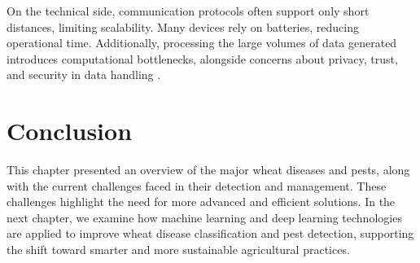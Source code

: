 On the technical side, communication protocols often support only short distances, limiting scalability. Many devices rely on batteries, reducing operational time. Additionally, processing the large volumes of data generated introduces computational bottlenecks, alongside concerns about privacy, trust, and security in data handling \parencite{idoje2021survey}.



\section{Conclusion}

This chapter presented an overview of the major wheat diseases and pests, along with the current challenges faced in their detection and management. These challenges highlight the need for more advanced and efficient solutions. In the next chapter, we examine how machine learning and deep learning technologies are applied to improve wheat disease classification and pest detection, supporting the shift toward smarter and more sustainable agricultural practices.

